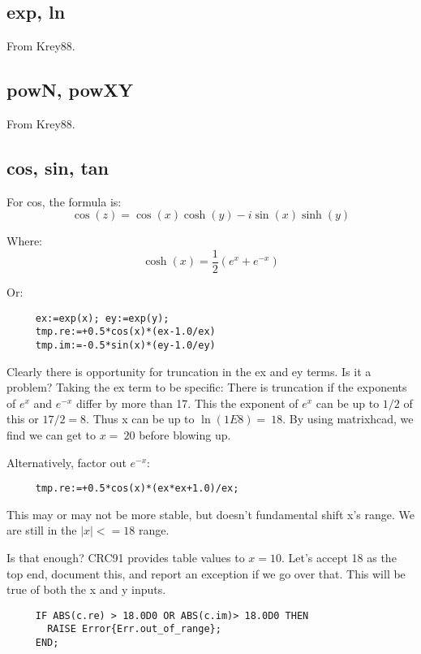 \subsection*{exp, ln}
From Krey88.

\subsection*{powN, powXY}
From Krey88.


\subsection*{cos, sin, tan}
For cos, the formula is:
\begin{equation}
  \cos(z)=\cos(x)\cosh(y) - i \sin(x)\sinh(y)
\end{equation}

Where:
\begin{equation}
  \cosh(x)=\frac{1}{2}(e^{x} + e^{-x})
\end{equation}

Or:
\begin{verbatim}
     ex:=exp(x); ey:=exp(y);
     tmp.re:=+0.5*cos(x)*(ex-1.0/ex)
     tmp.im:=-0.5*sin(x)*(ey-1.0/ey)
\end{verbatim}

Clearly there is opportunity for truncation in the ex and ey
terms.  Is it a problem? Taking the ex term to be specific:
There is truncation if the exponents of $e^x$ and $e^{-x}$ differ
by more than 17.  This the exponent of $e^x$ can be up to $1/2$
of this or $17/2 = 8$.  Thus x can be up to $\ln(1E8)=~18$.  By
using matrixhcad, we find we can get to $x=~20$ before blowing
up.

Alternatively, factor out $e^{-x}$:
\begin{verbatim}
     tmp.re:=+0.5*cos(x)*(ex*ex+1.0)/ex;
\end{verbatim}

This may or may not be more stable, but doesn't fundamental
shift x's range.  We are still in the $|x|<=18$ range.

Is that enough?  CRC91 provides table values to $x=10$.  Let's
accept 18 as the top end, document this, and report an
exception if we go over that.  This will be true of both the
x and y inputs.
\begin{tt} \begin{verbatim}
     IF ABS(c.re) > 18.0D0 OR ABS(c.im)> 18.0D0 THEN
       RAISE Error{Err.out_of_range};
     END;
\end{verbatim} \end{tt}

